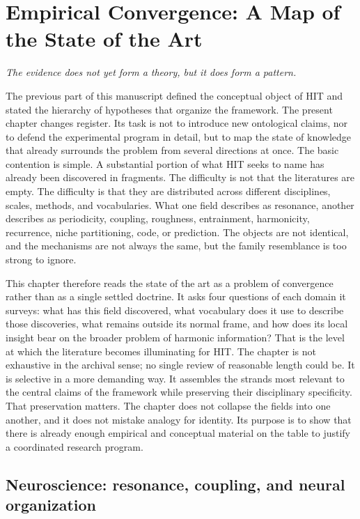 \chapter{Empirical Convergence: A Map of the State of the Art}

\epigraph{\emph{The evidence does not yet form a theory, but it does form a pattern.}}{}

The previous part of this manuscript defined the conceptual object of HIT and stated the hierarchy of hypotheses that organize the framework. The present chapter changes register. Its task is not to introduce new ontological claims, nor to defend the experimental program in detail, but to map the state of knowledge that already surrounds the problem from several directions at once. The basic contention is simple. A substantial portion of what HIT seeks to name has already been discovered in fragments. The difficulty is not that the literatures are empty. The difficulty is that they are distributed across different disciplines, scales, methods, and vocabularies. What one field describes as resonance, another describes as periodicity, coupling, roughness, entrainment, harmonicity, recurrence, niche partitioning, code, or prediction. The objects are not identical, and the mechanisms are not always the same, but the family resemblance is too strong to ignore.

This chapter therefore reads the state of the art as a problem of convergence rather than as a single settled doctrine. It asks four questions of each domain it surveys: what has this field discovered, what vocabulary does it use to describe those discoveries, what remains outside its normal frame, and how does its local insight bear on the broader problem of harmonic information? That is the level at which the literature becomes illuminating for HIT. The chapter is not exhaustive in the archival sense; no single review of reasonable length could be. It is selective in a more demanding way. It assembles the strands most relevant to the central claims of the framework while preserving their disciplinary specificity. That preservation matters. The chapter does not collapse the fields into one another, and it does not mistake analogy for identity. Its purpose is to show that there is already enough empirical and conceptual material on the table to justify a coordinated research program.

\section{Neuroscience: resonance, coupling, and neural organization}

